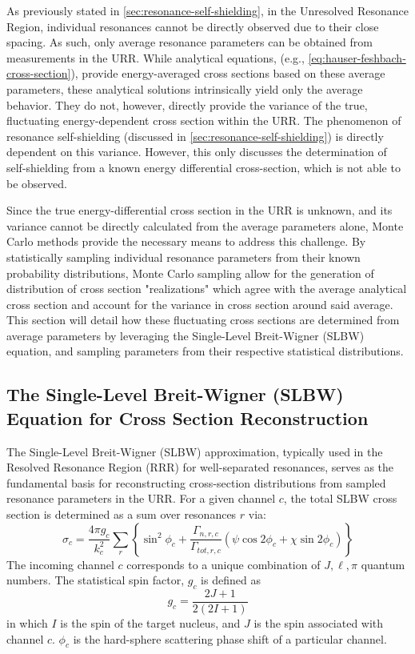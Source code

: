 As previously stated in \autoref{sec:resonance-self-shielding}, in the Unresolved Resonance Region, individual resonances cannot be directly observed due to their close spacing. As such, only average resonance parameters can be obtained from measurements in the URR. While analytical equations, (e.g., \autoref{eq:hauser-feshbach-cross-section}), provide energy-averaged cross sections based on these average parameters, these analytical solutions intrinsically yield only the average behavior. They do not, however, directly provide the variance of the true, fluctuating energy-dependent cross section within the URR. The phenomenon of resonance self-shielding (discussed in \autoref{sec:resonance-self-shielding}) is directly dependent on this variance. However, this only discusses the determination of self-shielding from a known energy differential cross-section, which is not able to be observed.

Since the true energy-differential cross section in the URR is unknown, and its variance cannot be directly calculated from the average parameters alone, Monte Carlo methods provide the necessary means to address this challenge. By statistically sampling individual resonance parameters from their known probability distributions, Monte Carlo sampling allow for the generation of distribution of cross section "realizations" which agree with the average analytical cross section and account for the variance in cross section around said average. This section will detail how these fluctuating cross sections are determined from average parameters by leveraging the Single-Level Breit-Wigner (SLBW) equation, and sampling parameters from their respective statistical distributions.

\subsection{The Single-Level Breit-Wigner (SLBW) Equation for Cross Section Reconstruction}
\label{sec:slbw-for-sampling}

The Single-Level Breit-Wigner (SLBW) approximation, typically used in the Resolved Resonance Region (RRR) for well-separated resonances, serves as the fundamental basis for reconstructing cross-section distributions from sampled resonance parameters in the URR. For a given channel $c$, the total SLBW cross section is determined as a sum over resonances $r$ via:
\begin{equation}
    \label{eq:slbw}
    \sigma_c = \frac{ 4 \pi g_c}{k_c^2} \sum_r 
        \left\{ \sin^2{\phi_c} + \frac{\Gamma_{n,r,c}}{\Gamma_{tot,r,c}}
            \left( \psi \cos{2 \phi_c} + \chi \sin{2\phi_c}
            \right)
        \right\}
\end{equation}
The incoming channel $c$ corresponds to a unique combination of $J,\ell,\pi$ quantum numbers. The statistical spin factor, $g_c$ is defined as
\begin{equation}
    g_c = \frac{2J + 1}{2(2I + 1)}
\end{equation}
in which $I$ is the spin of the target nucleus, and $J$ is the spin associated with channel $c$. $\phi_c$ is the hard-sphere scattering phase shift of a particular channel\cite{t2}.

